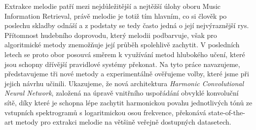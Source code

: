 \documentclass[12pt]{report}
\begin{document}
Extrakce melodie patří mezi nejdůležitější a nejtěžší úlohy oboru Music Information Retrieval, právě melodie je totiž tím hlavním, co si člověk po poslechu skladby odnáší a z podstaty se tedy často jedná o její nejvýraznější rys. Přítomnost hudebního doprovodu, který melodii podbarvuje, však pro algoritmické metody znemožňuje její průběh spolehlivě zachytit. V posledních letech se proto obor posouvá směrem k využívání metod hlubokého učení, které jsou schopny dřívější pravidlové systémy překonat. Na tyto práce navazujeme, představujeme tři nové metody a experimentálně ověřujeme volby, které jsme při jejich návrhu učinili. Ukazujeme, že nová architektura \emph{Harmonic Convolutional Neural Network}, založená na úpravě vnitřního uspořádání obvyklé konvoluční sítě, díky které je schopna lépe zachytit harmonickou povahu jednotlivých tónů ze vstupních spektrogramů s logaritmickou osou frekvence, překonává state-of-the-art metody pro extrakci melodie na většině veřejně dostupných datasetech.
\end{document}
